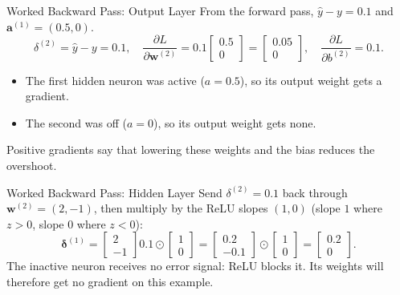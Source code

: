 \documentclass{ntuabeamer}
\begin{document}
\begin{frame}{Worked Backward Pass: Output Layer}
  From the forward pass, $\hat y-y=0.1$ and $\mathbf a^{(1)}=(0.5,0)$.
  \[
    \delta^{(2)}=\hat y-y=0.1,
    \quad
    \frac{\partial L}{\partial\mathbf w^{(2)}}
      =0.1\begin{bmatrix}0.5\\0\end{bmatrix}
      =\begin{bmatrix}0.05\\0\end{bmatrix},
    \quad
    \frac{\partial L}{\partial b^{(2)}}=0.1 .
  \]
  \begin{itemize}
    \item The first hidden neuron was active ($a=0.5$), so its output weight gets a gradient.
    \item The second was off ($a=0$), so its output weight gets none.
  \end{itemize}
  Positive gradients say that lowering these weights and the bias reduces the overshoot.
\end{frame}

\begin{frame}{Worked Backward Pass: Hidden Layer}
  Send $\delta^{(2)}=0.1$ back through $\mathbf w^{(2)}=(2,-1)$, then multiply by the ReLU slopes $(1,0)$
  (slope $1$ where $z>0$, slope $0$ where $z<0$):
  \[
    \boldsymbol\delta^{(1)}
    =\begin{bmatrix}2\\-1\end{bmatrix}0.1\odot\begin{bmatrix}1\\0\end{bmatrix}
    =\begin{bmatrix}0.2\\-0.1\end{bmatrix}\odot\begin{bmatrix}1\\0\end{bmatrix}
    =\begin{bmatrix}0.2\\0\end{bmatrix}.
  \]
  The inactive neuron receives no error signal: ReLU blocks it.
  Its weights will therefore get no gradient on this example.
\end{frame}
\end{document}
